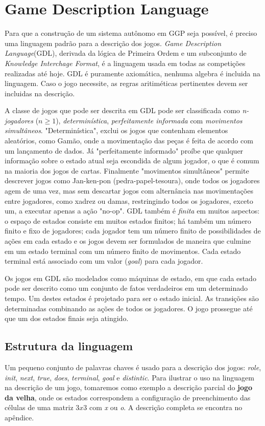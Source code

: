 \chapter{Game Description Language}
\label{gdl}

Para que a construção de um sistema autônomo em GGP seja possível, é preciso uma linguagem padrão para a descrição dos jogos. \textit{Game Description Language}\cite{gdl}(GDL), derivada da lógica de Primeira Ordem e um subconjunto de \textit{Knowledge Interchage Format}, é a linguagem usada em todas as competições realizadas até hoje. GDL é puramente axiomática, nenhuma algebra é incluida na linguagem. Caso o jogo necessite, as regras aritiméticas pertinentes devem ser incluidas na descrição.

A classe de jogos que pode ser descrita em GDL pode ser classificada como \textit{n-jogadores} ($n \geq 1 $), \textit{determinística}, \textit{perfeitamente informada} com \textit{movimentos simultâneos}. "Determinística", exclui os jogos que contenham elementos aleatórios, como Gamão, onde a movimentação das peças é feita de acordo com um lançamento de dados. Já "perfeitamente informado" proíbe que qualquer informação sobre o estado atual seja escondida de algum jogador, o que é comum na maioria dos jogos de cartas. Finalmente "movimentos simultâneos" permite descrever jogos como Jan-ken-pon (pedra-papel-tesoura), onde todos os jogadores agem de uma vez, mas sem descartar jogos com alternância nas movimentações entre jogadores, como xadrez ou damas, restringindo todos os jogadores, exceto um, a executar apenas a ação "no-op". GDL também é \textit{finita} em muitos aspectos: o espaço de estados consiste em muitos estados finitos; há também um número finito e fixo de jogadores; cada jogador tem um número finito de possibilidades de ações em cada estado e os jogos devem ser formulados de maneira que culmine em um estado terminal com um número finito de movimentos. Cada estado terminal está associado com um valor (\textit{goal}) para cada jogador. 

Os jogos em GDL são modelados como máquinas de estado, em que cada estado pode ser descrito como um conjunto de fatos verdadeiros em um determinado tempo. Um destes estados é projetado para ser o estado inicial. As transições são determinadas combinando as ações de todos os jogadores. O jogo prossegue até que um dos estados finais seja atingido.

\section{Estrutura da linguagem}
Um pequeno conjunto de palavras chaves é usado para a descrição dos jogos: \textit{role}, \textit{init}, \textit{next}, \textit{true}, \textit{does}, \textit{terminal}, \textit{goal} e \textit{distintic}. Para ilustrar o uso na linguagem na descrição de um jogo, tomaremos como exemplo a descrição parcial do \textbf{jogo da velha}, onde os estados correspondem a configuração de preenchimento das células de uma matriz $3x3$ com \textit{x} ou \textit{o}. A descrição completa se encontra no apêndice.

